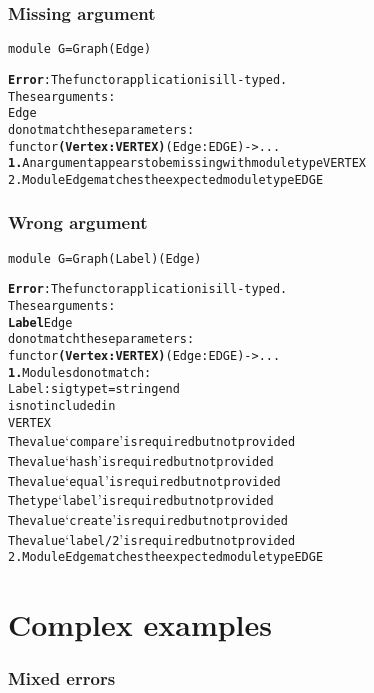 \documentclass[a4paper,11pt]{beamer}
\begin{document}
\begin{frame}[fragile]\frametitle{Missing argument}
\begin{verbatim}
module G=Graph(Edge)
\end{verbatim}
\begin{alltt}
{\bfseries{}\color{red}{}Error}: The functor application is ill-typed.
       These arguments:
         {\color{red}{}\bfseries{}} {\color{green}{}Edge}
       do not match these parameters:
         functor {\color{red}{}\bfseries{}(Vertex : VERTEX)} {\color{green}{}(Edge : EDGE)} -> ...
  {\color{red}{}\bfseries{}1.} An argument appears to be missing with module type VERTEX
  {\color{green}{}2.} Module Edge matches the expected module type EDGE
\end{alltt}
\end{frame}

\begin{frame}[fragile]\frametitle{Wrong argument}
\begin{verbatim}
module G=Graph(Label)(Edge)
\end{verbatim}
\begin{alltt}
{\bfseries{}\color{red}{}Error}: The functor application is ill-typed.
       These arguments:
         {\color{magenta}{}\bfseries{}Label} {\color{green}{}Edge}
       do not match these parameters:
         functor {\color{magenta}{}\bfseries{}(Vertex : VERTEX)} {\color{green}{}(Edge : EDGE)} -> ...
  {\color{magenta}{}\bfseries{}1.} Modules do not match:
       Label : sig type t = string end
     is not included in
       VERTEX
     The value `compare' is required but not provided
     The value `hash' is required but not provided
     The value `equal' is required but not provided
     The type `label' is required but not provided
     The value `create' is required but not provided
     The value `label/2' is required but not provided
  {\color{green}{}2.} Module Edge matches the expected module type EDGE

\end{alltt}
\end{frame}

\section{Complex examples}

\begin{frame}
\end{frame}

\begin{frame}[fragile]\frametitle{Mixed errors}
\end{frame}
\end{document}
